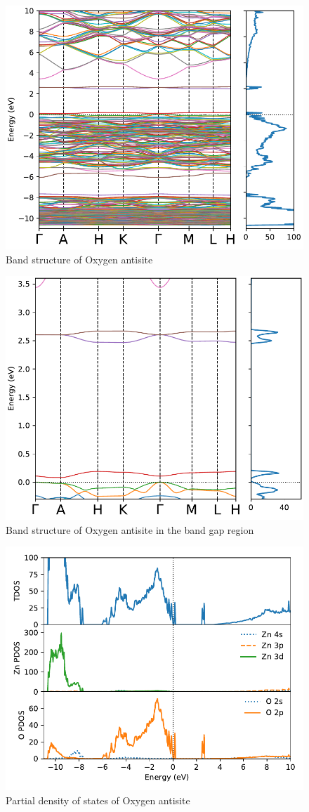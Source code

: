 \begin{figure}[tbh!]
	\centering
	\includegraphics[width=0.6\linewidth]{"images/rnd/band-dos_O_anti"}
	\caption[Band structure of Oxygen antisite]{Band structure of Oxygen antisite}
	\label{fig:band-dos_O_anti}
\end{figure}

\begin{figure}[tbh!]
	\centering
	\includegraphics[width=0.6\linewidth]{"images/rnd/band-dos-close_O_anti"}
	\caption[Band structure of Oxygen antisite in the band gap region]{Band structure of Oxygen antisite  in the band gap region}
	\label{fig:band-dos-close_O_anti}
\end{figure}

\clearpage

\begin{figure}[t!]
	\centering
	\includegraphics[width=0.6\linewidth]{"images/rnd/dos-pdos_O_anti"}
	\caption[Partial density of states of Oxygen antisite]{Partial density of states of Oxygen antisite}
	\label{fig:dos-pdos_O_anti}
\end{figure}

